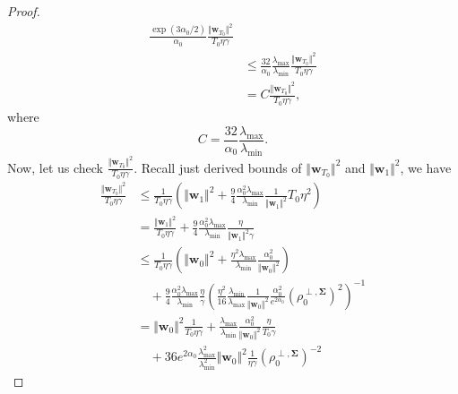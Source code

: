 \documentclass[pdflatex,sn-basic]{sn-jnl}%
\theoremstyle{thmstyleone}%
\begin{document}
\begin{appendices}
\begin{proof}
\begin{equation*}
\begin{aligned}
    \frac{ \exp \left({3 \alpha_0 /2 }\right)}{\alpha_0 }
    \frac{\Vert \mathbf{w}_{T_0} \Vert^2}{T_0 \eta \gamma}
    \\ & \le
    \frac{ 32 }{\alpha_0 }
    \frac{ \lambda_{\max}}{\lambda_{\min}}
    \frac{\Vert \mathbf{w}_{T_0} \Vert^2}{T_0 \eta \gamma}
    \\ & =
    {C}
    \frac{\Vert \mathbf{w}_{T_0} \Vert^2}{T_0 \eta \gamma}
    ,
  \end{aligned}
  \end{equation*}
  where
  \[
    C = \frac{ 32 }{\alpha_0 }
    \frac{ \lambda_{\max}}{\lambda_{\min}}.
  \]
  Now, let us check $\frac{\Vert \mathbf{w}_{T_0} \Vert^2}{T_0 \eta \gamma}$. 
  Recall just derived bounds of $\Vert \mathbf{w}_{T_0} \Vert^2$ and $\Vert \mathbf{w}_{1} \Vert^2$, we have 
  \begin{equation*}
  \begin{aligned}
    \frac{\Vert \mathbf{w}_{T_0} \Vert^2}{T_0 \eta \gamma} 
    & \le 
    \frac{1}{T_0 \eta \gamma} 
    \left(
      \Vert \mathbf{w}_{1} \Vert^2 
      + 
       \frac{9}{4} \frac{ \alpha_{0}^2 \lambda_{\max}}{\lambda_{\min}}
      \frac{1}{\Vert \mathbf{w}_{1} \Vert^2} T_0 \eta^2
    \right)
    \\& = 
    \frac{\Vert \mathbf{w}_{1} \Vert^2 }{T_0 \eta \gamma} 
    +
    \frac{9}{4} \frac{ \alpha_{0}^2 \lambda_{\max}}{\lambda_{\min}}
    \frac{\eta}{\Vert \mathbf{w}_{1} \Vert^2 \gamma}
    \\ & \le 
    \frac{1}{T_0 \eta \gamma} 
    \left(
      \Vert \mathbf{w}_{0} \Vert^2 
      +
      \frac{\eta^2 \lambda_{\max}}{\lambda_{\min}}
      \frac{\alpha_{0}^2}{\Vert \mathbf{w}_0 \Vert^2}
    \right)
    \\ & \quad
    +
    \frac{9}{4} \frac{ \alpha_{0}^2 \lambda_{\max}}{\lambda_{\min}}
    \frac{\eta}{\gamma}
    \left(
      \frac{\eta^2 }{16}
      \frac{\lambda_{\min} }{\lambda_{\max}}
      \frac{1}{\Vert \mathbf{w}_0 \Vert^2}
      \frac{\alpha_0^2}{e^{2\alpha_0}}
      \left(
        \rho_0^{\perp, \mathbf{\Sigma}}
      \right)^2
    \right)^{-1}
    \\ & =
    \Vert \mathbf{w}_{0} \Vert^2 \frac{1}{T_0 \eta \gamma} 
    + \frac{\lambda_{\max}}{\lambda_{\min}}
    \frac{\alpha_{0}^2}{\Vert \mathbf{w}_0 \Vert^2}
    \frac{\eta}{T_0 \gamma} 
    \\ & \quad
    + 36 e^{2\alpha_0}
    \frac{ \lambda_{\max}^2}{\lambda_{\min}^2}
    \Vert \mathbf{w}_0 \Vert^2
    \frac{1}{\eta \gamma}
    \left(
      \rho_0^{\perp, \mathbf{\Sigma}}
    \right)^{-2}

\end{aligned}
\end{equation*}
\end{proof}
\end{appendices}
\end{document}
